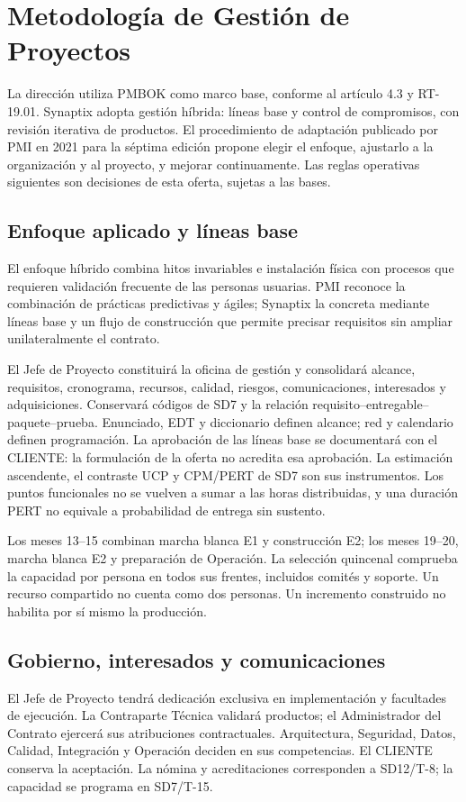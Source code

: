 \section{Metodología de Gestión de Proyectos}
La dirección utiliza PMBOK como marco base, conforme al artículo 4.3 y RT-19.01. Synaptix adopta gestión híbrida: líneas base y control de compromisos, con revisión iterativa de productos. El procedimiento de adaptación publicado por PMI en 2021 para la séptima edición propone elegir el enfoque, ajustarlo a la organización y al proyecto, y mejorar continuamente. Las reglas operativas siguientes son decisiones de esta oferta, sujetas a las bases. \parencites[art.~4.3, pp.~5--6]{sd6-ba}[RT-19.01, p.~33]{sd6-bt}[pp.~1--7]{sd6-pmi-adaptacion}

\subsection{Enfoque aplicado y líneas base}
El enfoque híbrido combina hitos invariables e instalación física con procesos que requieren validación frecuente de las personas usuarias. PMI reconoce la combinación de prácticas predictivas y ágiles; Synaptix la concreta mediante líneas base y un flujo de construcción que permite precisar requisitos sin ampliar unilateralmente el contrato. \parencite{sd6-pmi-hibrido}

El Jefe de Proyecto constituirá la oficina de gestión y consolidará alcance, requisitos, cronograma, recursos, calidad, riesgos, comunicaciones, interesados y adquisiciones. Conservará códigos de SD7 y la relación requisito--entregable--paquete--prueba. Enunciado, EDT y diccionario definen alcance; red y calendario definen programación. La aprobación de las líneas base se documentará con el CLIENTE: la formulación de la oferta no acredita esa aprobación. La estimación ascendente, el contraste UCP y CPM/PERT de SD7 son sus instrumentos. Los puntos funcionales no se vuelven a sumar a las horas distribuidas, y una duración PERT no equivale a probabilidad de entrega sin sustento. \parencites[RT-19.03--05, p.~33]{sd6-bt}[art.~72, p.~38]{sd6-ba}

Los meses 13--15 combinan marcha blanca E1 y construcción E2; los meses 19--20, marcha blanca E2 y preparación de Operación. La selección quincenal comprueba la capacidad por persona en todos sus frentes, incluidos comités y soporte. Un recurso compartido no cuenta como dos personas. Un incremento construido no habilita por sí mismo la producción.

\subsection{Gobierno, interesados y comunicaciones}
El Jefe de Proyecto tendrá dedicación exclusiva en implementación y facultades de ejecución. La Contraparte Técnica validará productos; el Administrador del Contrato ejercerá sus atribuciones contractuales. Arquitectura, Seguridad, Datos, Calidad, Integración y Operación deciden en sus competencias. El CLIENTE conserva la aceptación. La nómina y acreditaciones corresponden a SD12/T-8; la capacidad se programa en SD7/T-15. \parencites[arts.~70--71, p.~37]{sd6-ba}[cap.~19, pp.~33--34]{sd6-bt}

